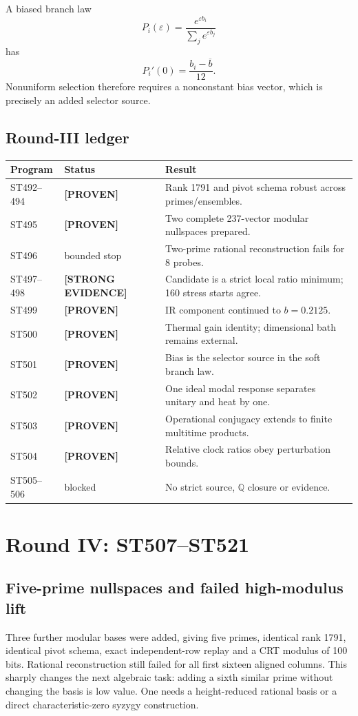 \documentclass[11pt,a4paper]{article}
\theoremstyle{definition}\newtheorem{definition}[theorem]{Definition}
\theoremstyle{remark}\newtheorem{remark}[theorem]{Remark}
\newcommand{\status}[2]{\textcolor{#1}{\textbf{[#2]}}}
\newcommand{\proven}{\status{fingreen}{PROVEN}}\newcommand{\strong}{\status{finblue}{STRONG EVIDENCE}}
\begin{document}
A biased branch law
\[
P_i(\varepsilon)=\frac{e^{\varepsilon b_i}}{\sum_j e^{\varepsilon b_j}}
\]
has
\[
P_i'(0)=\frac{b_i-\overline b}{12}.
\]
Nonuniform selection therefore requires a nonconstant bias vector, which is precisely an added selector source.

\subsection{Round-III ledger}
\begin{longtable}{@{}p{}p{}p{}@{}}\toprule Program&Status&Result\\\midrule\endhead
ST492--494&\proven&Rank 1791 and pivot schema robust across primes/ensembles.\\
ST495&\proven&Two complete 237-vector modular nullspaces prepared.\\
ST496&bounded stop&Two-prime rational reconstruction fails for 8 probes.\\
ST497--498&\strong&Candidate is a strict local ratio minimum; 160 stress starts agree.\\
ST499&\proven&IR component continued to $b=0.2125$.\\
ST500&\proven&Thermal gain identity; dimensional bath remains external.\\
ST501&\proven&Bias is the selector source in the soft branch law.\\
ST502&\proven&One ideal modal response separates unitary and heat by one.\\
ST503&\proven&Operational conjugacy extends to finite multitime products.\\
ST504&\proven&Relative clock ratios obey perturbation bounds.\\
ST505--506&blocked&No strict source, $\mathbb Q$ closure or evidence.\\\bottomrule\end{longtable}

\section{Round IV: ST507--ST521}

\subsection{Five-prime nullspaces and failed high-modulus lift}

Three further modular bases were added, giving five primes, identical rank 1791, identical pivot schema, exact independent-row replay and a CRT modulus of 100 bits. Rational reconstruction still failed for all first sixteen aligned columns. This sharply changes the next algebraic task: adding a sixth similar prime without changing the basis is low value. One needs a height-reduced rational basis or a direct characteristic-zero syzygy construction.
\end{document}
